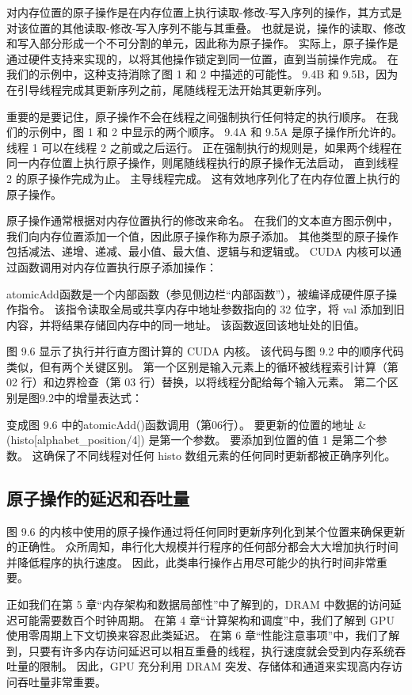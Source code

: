 对内存位置的原子操作是在内存位置上执行读取-修改-写入序列的操作，其方式是对该位置的其他读取-修改-写入序列不能与其重叠。 
也就是说，操作的读取、修改和写入部分形成一个不可分割的单元，因此称为原子操作。 
实际上，原子操作是通过硬件支持来实现的，以将其他操作锁定到同一位置，直到当前操作完成。 
在我们的示例中，这种支持消除了图 1 和 2 中描述的可能性。 
9.4B 和 9.5B，因为在引导线程完成其更新序列之前，尾随线程无法开始其更新序列。

重要的是要记住，原子操作不会在线程之间强制执行任何特定的执行顺序。 在我们的示例中，图 1 和 2 中显示的两个顺序。 
9.4A 和 9.5A 是原子操作所允许的。 线程 1 可以在线程 2 之前或之后运行。
正在强制执行的规则是，如果两个线程在同一内存位置上执行原子操作，则尾随线程执行的原子操作无法启动，
直到线程 2 的原子操作完成为止。 主导线程完成。 这有效地序列化了在内存位置上执行的原子操作。

原子操作通常根据对内存位置执行的修改来命名。 在我们的文本直方图示例中，我们向内存位置添加一个值，因此原子操作称为原子添加。 
其他类型的原子操作包括减法、递增、递减、最小值、最大值、逻辑与和逻辑或。 
CUDA 内核可以通过函数调用对内存位置执行原子添加操作：

atomicAdd函数是一个内部函数（参见侧边栏“内部函数”），被编译成硬件原子操作指令。 
该指令读取全局或共享内存中地址参数指向的 32 位字，将 val 添加到旧内容，并将结果存储回内存中的同一地址。 
该函数返回该地址处的旧值。

图 9.6 显示了执行并行直方图计算的 CUDA 内核。 该代码与图 9.2 中的顺序代码类似，但有两个关键区别。 
第一个区别是输入元素上的循环被线程索引计算（第 02 行）和边界检查（第 03 行）替换，以将线程分配给每个输入元素。 
第二个区别是图9.2中的增量表达式：

变成图 9.6 中的atomicAdd()函数调用（第06行）。 要更新的位置的地址 \&(histo[alphabet\_position/4]) 是第一个参数。
要添加到位置的值 1 是第二个参数。 这确保了不同线程对任何 histo 数组元素的任何同时更新都被正确序列化。

\subsection{原子操作的延迟和吞吐量}
图 9.6 的内核中使用的原子操作通过将任何同时更新序列化到某个位置来确保更新的正确性。 
众所周知，串行化大规模并行程序的任何部分都会大大增加执行时间并降低程序的执行速度。 
因此，此类串行操作占用尽可能少的执行时间非常重要。

正如我们在第 5 章“内存架构和数据局部性”中了解到的，DRAM 中数据的访问延迟可能需要数百个时钟周期。 
在第 4 章“计算架构和调度”中，我们了解到 GPU 使用零周期上下文切换来容忍此类延迟。 
在第 6 章“性能注意事项”中，我们了解到，只要有许多内存访问延迟可以相互重叠的线程，执行速度就会受到内存系统吞吐量的限制。 
因此，GPU 充分利用 DRAM 突发、存储体和通道来实现高内存访问吞吐量非常重要。

